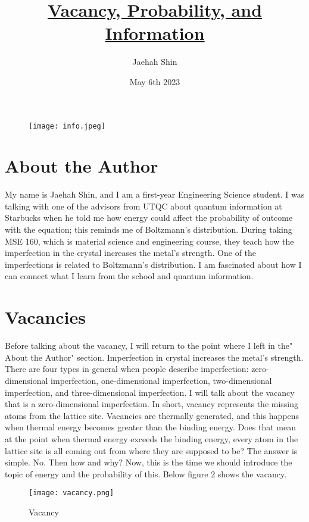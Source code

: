 \documentclass{article}
\title{\underline {\textbf{Vacancy, Probability, and Information}}}
\author{Jaehah Shin}
\date{May 6th 2023}
\begin{document}
\maketitle
\begin{figure}[h]
    \centering
    \texttt{[image: info.jpeg]}
    \label{fig1}
    
\end{figure}

\section{About the Author}
My name is Jaehah Shin, and I am a first-year Engineering Science student. 
I was talking with one of the advisors from UTQC about quantum information at Starbucks when he told me how energy could affect the probability of outcome with the equation;
this reminds me of Boltzmann's distribution. During taking MSE 160, which is material science and engineering course, they teach how the imperfection in the crystal increases the metal's strength. 
One of the imperfections is related to Boltzmann's distribution.
I am fascinated about how I can connect what I learn from the school and quantum information.
\section{Vacancies}
Before talking about the vacancy, I will return to the point where I left in the" About the Author" section. 
Imperfection in crystal increases the metal's strength. 
There are four types in general when people describe imperfection: zero-dimensional imperfection, one-dimensional imperfection, two-dimensional imperfection, and three-dimensional imperfection. 
I will talk about the vacancy that is a zero-dimensional imperfection. 
In short, vacancy represents the missing atoms from the lattice site.
Vacancies are thermally generated, and this happens when thermal energy becomes greater than the binding energy. 
Does that mean at the point when thermal energy exceeds the binding energy, every atom in the lattice site is all coming out from where they are supposed to be? 
The answer is simple. No. Then how and why? 
Now, this is the time we should introduce the topic of energy and the probability of this. 
Below figure 2 shows the vacancy.
\begin{figure}[h]
    \centering
    \texttt{[image: vacancy.png]}
    \caption{Vacancy}
    \label{fig:Vacancy}
\end{figure}
\end{document}
